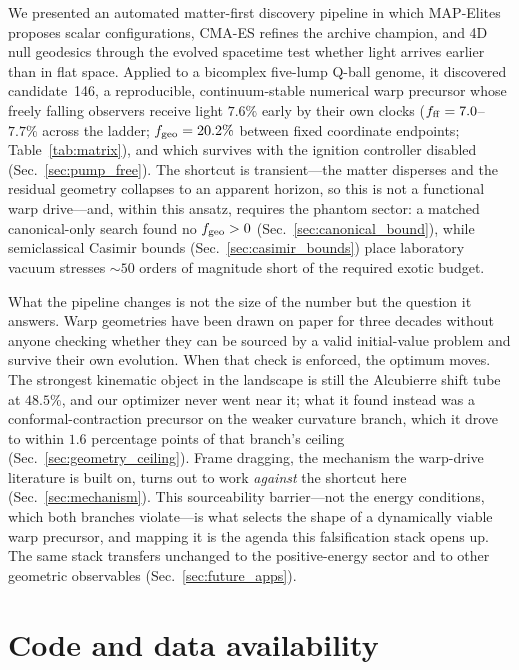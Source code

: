 \documentclass[twocolumn,floatfix,aps,prd,nofootinbib]{revtex4-2}
\begin{document}
We presented an automated matter-first discovery pipeline in which
MAP-Elites proposes scalar configurations, CMA-ES refines the archive
champion, and 4D null geodesics through the evolved spacetime test whether
light arrives earlier than in flat space. Applied to a bicomplex five-lump
Q-ball genome, it discovered candidate~146, a reproducible,
continuum-stable numerical warp precursor whose freely falling observers
receive light $7.6\%$ early by their own clocks ($f_{\rm ff}=7.0$--$7.7\%$
across the ladder; $f_{\rm geo}=20.2\%$ between fixed coordinate endpoints;
Table~\ref{tab:matrix}), and which survives with the ignition controller
disabled (Sec.~\ref{sec:pump_free}). The shortcut is transient---the matter
disperses and the residual geometry collapses to an apparent horizon, so this
is not a functional warp drive---and, within this ansatz, requires the phantom
sector: a matched
canonical-only search found no $f_{\rm geo}>0$
(Sec.~\ref{sec:canonical_bound}), while semiclassical Casimir bounds
(Sec.~\ref{sec:casimir_bounds}) place laboratory vacuum stresses
${\sim}50$ orders of magnitude short of the required exotic budget.

What the pipeline changes is not the size of the number but the question it
answers. Warp geometries have been drawn on paper for three decades without
anyone checking whether they can be sourced by a valid initial-value problem
and survive their own evolution. When that check is enforced, the optimum
moves. The strongest kinematic object in the landscape is still the Alcubierre
shift tube at $48.5\%$, and our optimizer never went near it; what it found
instead was a conformal-contraction precursor on the weaker curvature branch,
which it drove to within $1.6$ percentage points of that branch's ceiling
(Sec.~\ref{sec:geometry_ceiling}). Frame dragging, the mechanism the
warp-drive literature is built on, turns out to work \emph{against} the
shortcut here (Sec.~\ref{sec:mechanism}). This sourceability barrier---not the
energy conditions, which both branches violate---is what selects the shape of
a dynamically viable warp precursor, and mapping it is the agenda this
falsification stack opens up. The same stack transfers unchanged to the
positive-energy sector and to other geometric observables
(Sec.~\ref{sec:future_apps}).

\section*{Code and data availability}
\end{document}
